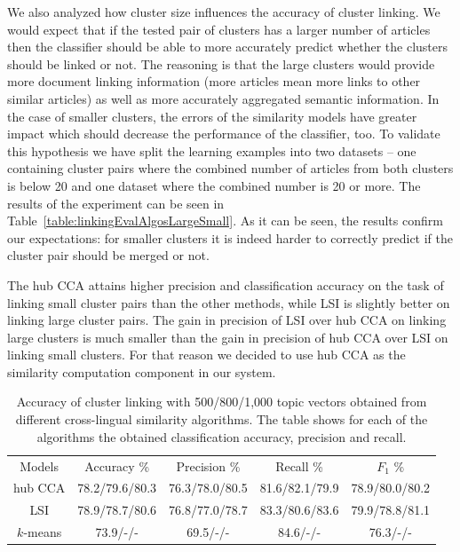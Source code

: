 We also analyzed how cluster size influences the accuracy of cluster linking. We would expect that if the tested pair of clusters has a larger number of articles then the classifier should be able to more accurately predict whether the clusters should be linked or not. The reasoning is that the large clusters would provide more document linking information (more articles mean more links to other similar articles) as well as more accurately aggregated semantic information. In the case of smaller clusters, the errors of the similarity models have greater impact which should decrease the performance of the classifier, too. To validate this hypothesis we have split the learning examples into two datasets -- one containing cluster pairs where the combined number of articles from both clusters is below 20 and one dataset where the combined number is 20 or more. The results of the experiment can be seen in Table~\ref{table:linkingEvalAlgosLargeSmall}. As it can be seen, the results confirm our expectations: for smaller clusters it is indeed harder to correctly predict if the cluster pair should be merged or not.

The hub CCA attains higher precision and classification accuracy on the task of linking small cluster pairs than the other methods, while LSI is slightly better on linking large cluster pairs. The gain in precision of LSI over hub CCA on linking large clusters is much smaller than the gain in precision of hub CCA over LSI on linking small clusters. For that reason we decided to use hub CCA as the similarity computation component in our system.

%

\begin{table}[h]
\caption{Accuracy of cluster linking with 500/800/1,000 topic vectors obtained from different cross-lingual similarity algorithms. The table shows for each of the algorithms the obtained classification accuracy, precision and recall.}
\label{table:linkingEvalAlgos}
\begin{center}
\begin{tabular}{|c|c|c|c|c|}
  \hline
  \cline{1-5}
  Models & Accuracy \% & Precision \% & Recall \% & $F_1$ \% \\ \cline{1-5}
  hub CCA  & 78.2/79.6/80.3 & 76.3/78.0/80.5  & 81.6/82.1/79.9 & 78.9/80.0/80.2
  \\ \cline{1-5}
  LSI      & 78.9/78.7/80.6  & 76.8/77.0/78.7 & 83.3/80.6/83.6 & 79.9/78.8/81.1  \\ \cline{1-5}
 $k$-means & 73.9/-/- & 69.5/-/- & 84.6/-/- &  76.3/-/- \\ \cline{1-5}
\end{tabular}
\end{center}
\end{table}

